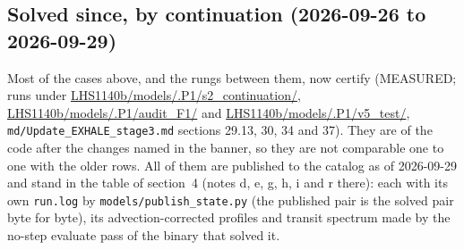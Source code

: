 \documentclass[11pt]{my_memo}
\begin{document}
\subsection*{Solved since, by continuation (2026-09-26 to 2026-09-29)}

Most of the cases above, and the rungs between them, now certify (MEASURED;
runs under \url{LHS1140b/models/.P1/s2_continuation/},
\url{LHS1140b/models/.P1/audit_F1/} and \url{LHS1140b/models/.P1/v5_test/},
\texttt{md/Update\_EXHALE\_stage3.md} sections 29.13, 30, 34 and 37). They
are of the code after the changes named in the banner, so they are not
comparable one to one with the older rows. All of them are published to
the catalog as of 2026-09-29 and stand in the table of section~4 (notes d,
e, g, h, i and r there): each with its own \texttt{run.log} by
\texttt{models/publish\_state.py} (the published pair is the solved pair
byte for byte), its advection-corrected profiles and transit spectrum made
by the no-step evaluate pass of the binary that solved it.
\end{document}
